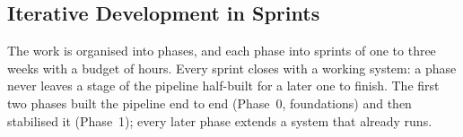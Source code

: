 
\subsection{Iterative Development in Sprints}
\label{subsec:sprints}

The work is organised into phases, and each phase into sprints of one
to three weeks with a budget of hours. Every sprint closes with a
working system: a phase never leaves a stage of the pipeline
half-built for a later one to finish. The first two phases built the
pipeline end to end (Phase~0, foundations) and then stabilised it
(Phase~1); every later phase extends a system that already runs.
